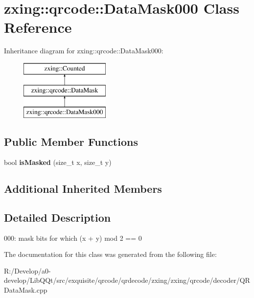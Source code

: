 \hypertarget{classzxing_1_1qrcode_1_1_data_mask000}{}\section{zxing\+:\+:qrcode\+:\+:Data\+Mask000 Class Reference}
\label{classzxing_1_1qrcode_1_1_data_mask000}
Inheritance diagram for zxing\+:\+:qrcode\+:\+:Data\+Mask000\+:\begin{figure}[H]
\begin{center}
\leavevmode
\includegraphics[height=3.000000cm]{classzxing_1_1qrcode_1_1_data_mask000}
\end{center}
\end{figure}
\subsection*{Public Member Functions}
\begin{DoxyCompactItemize}
\item 
\mbox{\label{classzxing_1_1qrcode_1_1_data_mask000_ab2203f783ed75970009fd01f425d4348}} 
bool {\bfseries is\+Masked} (size\+\_\+t x, size\+\_\+t y)
\end{DoxyCompactItemize}
\subsection*{Additional Inherited Members}


\subsection{Detailed Description}
000\+: mask bits for which (x + y) mod 2 == 0 

The documentation for this class was generated from the following file\+:\begin{DoxyCompactItemize}
\item 
R\+:/\+Develop/a0-\/develop/\+Lib\+Q\+Qt/src/exquisite/qrcode/qrdecode/zxing/zxing/qrcode/decoder/Q\+R\+Data\+Mask.\+cpp\end{DoxyCompactItemize}
